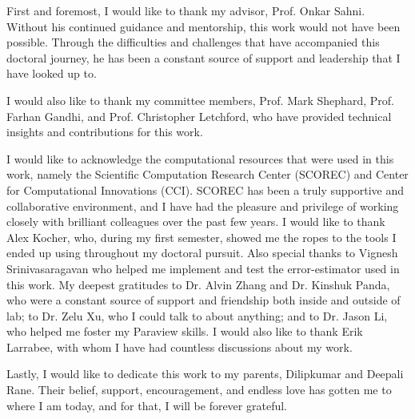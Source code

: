  
 
First and foremost, I would like to thank my advisor, Prof. Onkar Sahni. 
Without his continued guidance and mentorship, this work would not have been possible.
Through the difficulties and challenges that have accompanied this doctoral journey, he has been a constant source of support and leadership that I have looked up to.

I would also like to thank my committee members, Prof. Mark Shephard, Prof. Farhan Gandhi, and Prof. Christopher Letchford, who have provided technical insights and contributions for this work.

I would like to acknowledge the computational resources that were used in this work, namely the Scientific Computation Research Center (SCOREC) and Center for Computational Innovations (CCI).
SCOREC has been a truly supportive and collaborative environment, and I have had the pleasure and privilege of working closely with brilliant colleagues over the past few years.
I would like to thank Alex Kocher, who, during my first semester, showed me the ropes to the tools I ended up using throughout my doctoral pursuit.
Also special thanks to Vignesh Srinivasaragavan who helped me implement and test the error-estimator used in this work.
My deepest gratitudes to Dr. Alvin Zhang and Dr. Kinshuk Panda, who were a constant source of support and friendship both inside and outside of lab; to Dr. Zelu Xu, who I could talk to about anything; and to Dr. Jason Li, who helped me foster my Paraview skills.
I would also like to thank Erik Larrabee, with whom I have had countless discussions about my work.

Lastly, I would like to dedicate this work to my parents, Dilipkumar and Deepali Rane. Their belief, support, encouragement, and endless love has gotten me to where I am today, and for that, I will be forever grateful.
